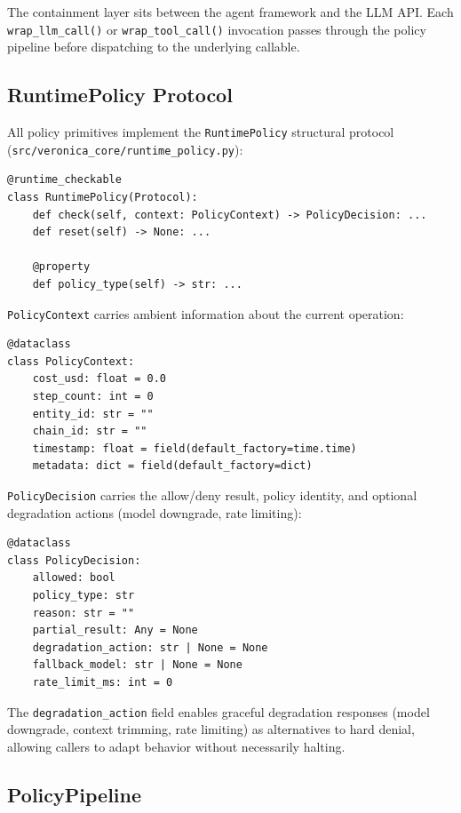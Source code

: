 \documentclass[11pt]{article}
\begin{document}
The containment layer sits between the agent framework and the LLM API. Each
\texttt{wrap\_llm\_call()} or \texttt{wrap\_tool\_call()} invocation passes
through the policy pipeline before dispatching to the underlying callable.

\subsection{RuntimePolicy Protocol}

All policy primitives implement the \texttt{RuntimePolicy} structural protocol
(\texttt{src/veronica\_core/runtime\_policy.py}):

\begin{lstlisting}
@runtime_checkable
class RuntimePolicy(Protocol):
    def check(self, context: PolicyContext) -> PolicyDecision: ...
    def reset(self) -> None: ...

    @property
    def policy_type(self) -> str: ...
\end{lstlisting}

\texttt{PolicyContext} carries ambient information about the current operation:

\begin{lstlisting}
@dataclass
class PolicyContext:
    cost_usd: float = 0.0
    step_count: int = 0
    entity_id: str = ""
    chain_id: str = ""
    timestamp: float = field(default_factory=time.time)
    metadata: dict = field(default_factory=dict)
\end{lstlisting}

\texttt{PolicyDecision} carries the allow/deny result, policy identity, and
optional degradation actions (model downgrade, rate limiting):

\begin{lstlisting}
@dataclass
class PolicyDecision:
    allowed: bool
    policy_type: str
    reason: str = ""
    partial_result: Any = None
    degradation_action: str | None = None
    fallback_model: str | None = None
    rate_limit_ms: int = 0
\end{lstlisting}

The \texttt{degradation\_action} field enables graceful degradation responses
(model downgrade, context trimming, rate limiting) as alternatives to hard
denial, allowing callers to adapt behavior without necessarily halting.

\subsection{PolicyPipeline}
\end{document}
